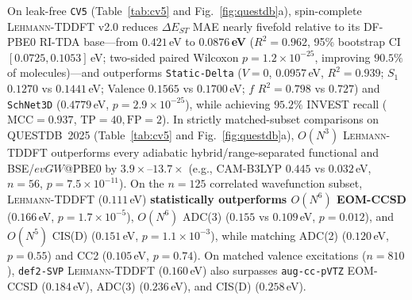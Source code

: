 \documentclass[10pt,twocolumn]{article}
\theoremstyle{natthm}
\newcommand{\leh}{\textsc{Lehmann-TDDFT}}
\newcommand{\dEST}{\Delta E_{ST}}
\begin{document}
On leak-free \texttt{CV5} (Table~\ref{tab:cv5} and Fig.~\ref{fig:questdb}a), spin-complete \leh{} v2.0 reduces $\dEST$ MAE nearly fivefold relative to its DF-PBE0 RI-TDA base---from $0.421$\,eV to \textbf{$0.0876$\,eV} ($R^2=0.962$, 95\% bootstrap CI\cite{efron1979} $[0.0725,0.1053]$\,eV; two-sided paired Wilcoxon\cite{wilcoxon1945} $p=1.2\times 10^{-25}$, improving $90.5\%$ of molecules)---and outperforms \texttt{Static-Delta} ($V=0$, $0.0957$\,eV, $R^2=0.939$; $S_1$ $0.1270$ vs $0.1441$\,eV; Valence $0.1565$ vs $0.1700$\,eV; $f$ $R^2=0.798$ vs $0.727$) and \texttt{SchNet3D} ($0.4779$\,eV, $p=2.9\times 10^{-25}$), while achieving $95.2\%$ INVEST recall ($\mathrm{MCC}=0.937$, $\mathrm{TP}=40, \mathrm{FP}=2$).
In strictly matched-subset comparisons on QUESTDB~2025 (Table~\ref{tab:cv5} and Fig.~\ref{fig:questdb}a), $O(N^3)$ \leh{} outperforms every adiabatic hybrid/range-separated functional\cite{becke1993,yanai2004,chai2008} and BSE/$evGW$@PBE0 by $3.9\times$--$13.7\times$ (e.g., CAM-B3LYP $0.445$ vs $0.032$\,eV, $n=56$, $p=7.5\times 10^{-11}$).
On the $n=125$ correlated wavefunction subset, \leh{} ($0.111$\,eV) \textbf{statistically outperforms $O(N^6)$ EOM-CCSD} ($0.166$\,eV, $p=1.7\times 10^{-5}$), $O(N^6)$ ADC(3) ($0.155$ vs $0.109$\,eV, $p=0.012$), and $O(N^5)$ CIS(D) ($0.151$\,eV, $p=1.1\times 10^{-3}$), while matching ADC(2) ($0.120$\,eV, $p=0.55$) and CC2 ($0.105$\,eV, $p=0.74$).
On matched valence excitations ($n=810$), \texttt{def2-SVP} \leh{} ($0.160$\,eV) also surpasses \texttt{aug-cc-pVTZ} EOM-CCSD ($0.184$\,eV), ADC(3) ($0.236$\,eV), and CIS(D) ($0.258$\,eV).
\end{document}
